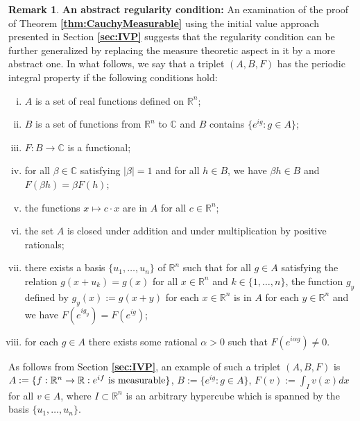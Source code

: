 \documentclass[12 pt]{amsart}
\theoremstyle{definition}
\newtheorem{remark}[thm]{Remark}
\newcommand{\R}{\mathbb{R}}
\newcommand{\C}{\mathbb{C}}
\newcommand{\bref}[1]{\textbf{\ref{#1}}} %
\begin{document}
\begin{remark}{\bf An abstract regularity condition:} \label{rem:Abstract}
An examination of the proof of Theorem \bref{thm:CauchyMeasurable} using the initial value 
approach presented in Section \bref{sec:IVP} suggests that the regularity condition can be further generalized by replacing the measure theoretic aspect in it by a more abstract one.  In what follows, we say that a triplet $(A,B,F)$ has  the periodic integral property if the following conditions hold: 
 
\begin{enumerate}[(i)]
\item $A$ is a set of real functions defined on $\R^n$;
\item $B$ is a set of functions from $\R^n$ to $\C$ and $B$ contains $\{e^{ig}: g\in A\}$;
\item $F:B\to\C$ is a functional;
\item for all $\beta\in \C$ satisfying $|\beta|=1$ and for all $h\in B$, we have $\beta h\in B$ and $F(\beta h)=\beta F(h)$;
\item the functions $x\mapsto c\cdot x$ are in $A$ for all $c\in \R^n$;
\item\label{item:VectorSpace} the set $A$ is closed under addition and under multiplication by positive rationals;
\item\label{item:F(g_y)=F(g)} there exists a basis $\{u_1,\ldots,u_n\}$ of $\R^n$ such that for all $g\in A$ satisfying the relation  $g(x+u_k)=g(x)$ for all $x\in \R^n$ and $k\in \{1,\ldots,n\}$, the function $g_y$  defined by $g_y(x):=g(x+y)$ for each $x\in \R^n$ is in $A$ for each $y\in \R^n$ 
and we have $F(e^{i g_y})=F(e^{i g})$; 
\item\label{item:alpha} for each $g\in A$ there exists some rational $\alpha>0$ such that $F(e^{i \alpha g})\neq 0$.
\end{enumerate}
As follows from Section \bref{sec:IVP}, an example of such a triplet $(A,B,F)$ is $A:=\{f:\R^n\to\R: e^{if}\,\,\textnormal{is  measurable}\}$, $B:=\{e^{ig}: g\in A\}$, $F(v):=\int_I v(x)dx$ for all $v\in A$, where $I\subset \R^n$ is an arbitrary hypercube which is spanned by the basis $\{u_1,\ldots,u_n\}$. 


\end{remark}
\end{document}
